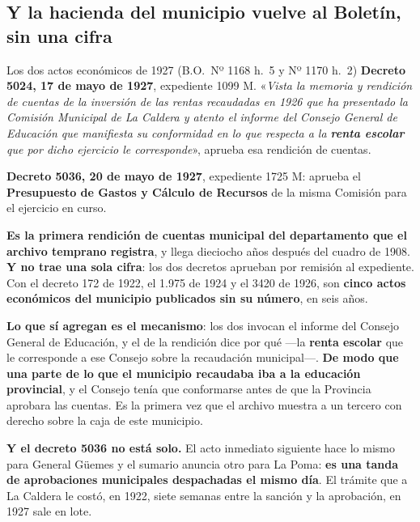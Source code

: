\subsection*{Y la hacienda del municipio vuelve al Boletín, sin una cifra}

\begin{ficha}{Los dos actos económicos de 1927 (B.O.\ Nº 1168 h.\ 5 y Nº 1170 h.\ 2)}
\textbf{Decreto 5024, 17 de mayo de 1927}, expediente 1099 M. «\textit{Vista la memoria y
rendición de cuentas de la inversión de las rentas recaudadas en 1926 que ha presentado la
Comisión Municipal de La Caldera y atento el informe del Consejo General de Educación que
manifiesta su conformidad en lo que respecta a la \textbf{renta escolar} que por dicho ejercicio
le corresponde}», aprueba esa rendición de cuentas.

\textbf{Decreto 5036, 20 de mayo de 1927}, expediente 1725 M: aprueba el \textbf{Presupuesto de
Gastos y Cálculo de Recursos} de la misma Comisión para el ejercicio en curso.
\end{ficha}

\begin{cautela}
\textbf{Es la primera rendición de cuentas municipal del departamento que el archivo temprano
registra}, y llega dieciocho años después del cuadro de 1908. \textbf{Y no trae una sola cifra}:
los dos decretos aprueban por remisión al expediente. Con el decreto 172 de 1922, el 1.975 de
1924 y el 3420 de 1926, son \textbf{cinco actos económicos del municipio publicados sin su
número}, en seis años.

\textbf{Lo que sí agregan es el mecanismo}: los dos invocan el informe del Consejo General de
Educación, y el de la rendición dice por qué ---la \textbf{renta escolar} que le corresponde a ese
Consejo sobre la recaudación municipal---. \textbf{De modo que una parte de lo que el municipio
recaudaba iba a la educación provincial}, y el Consejo tenía que conformarse antes de que la
Provincia aprobara las cuentas. Es la primera vez que el archivo muestra a un tercero con derecho
sobre la caja de este municipio.

\textbf{Y el decreto 5036 no está solo.} El acto inmediato siguiente hace lo mismo para General
Güemes y el sumario anuncia otro para La Poma: \textbf{es una tanda de aprobaciones municipales
despachadas el mismo día}. El trámite que a La Caldera le costó, en 1922, siete semanas entre la
sanción y la aprobación, en 1927 sale en lote.
\end{cautela}

